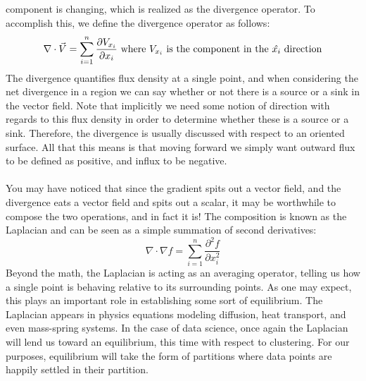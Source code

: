component is changing, which is realized as the divergence
operator. To accomplish this, we define the divergence operator as
follows: 
\[
\nabla  \cdot \vec{V} = \sum_{i=1}^n \frac{\partial V_{x_i}}{\partial
  x_i} \textnormal{ where \(V_{x_i}\) is the component in the
  \(\hat{x_i}\) direction} 
\]
The divergence quantifies flux density at a single point, and when
considering the net divergence in a region we can say whether or not
there is a source or a sink in the vector field. Note that implicitly
we need some notion of direction with regards to this flux density in
order to determine whether these is a source or a sink. Therefore, the
divergence is usually discussed with respect to an oriented
surface. All that this means is that moving forward we simply want
outward flux to be defined as positive, and influx to be negative. 
\\\\
You may have noticed that since the gradient spits out a vector field,
and the divergence eats a vector field and spits out a scalar, it may
be worthwhile to compose the two operations, and in fact it is! The
composition is known as the Laplacian and can be seen as a simple
summation of second derivatives: 
\[
\nabla \cdot \nabla f = \sum_{i=1}^n \frac{\partial^2 f}{\partial x_i^2}
\]
Beyond the math, the Laplacian is acting as an averaging operator,
telling us how a single point is behaving relative to its surrounding
points. As one may expect, this plays an important role in
establishing some sort of equilibrium. The Laplacian appears in
physics equations modeling diffusion, heat transport, and even
mass-spring systems. In the case of data science, once again the
Laplacian will lend us toward an equilibrium, this time with respect
to clustering. For our purposes, equilibrium will take the form of
partitions where data points are happily settled in their partition. 

